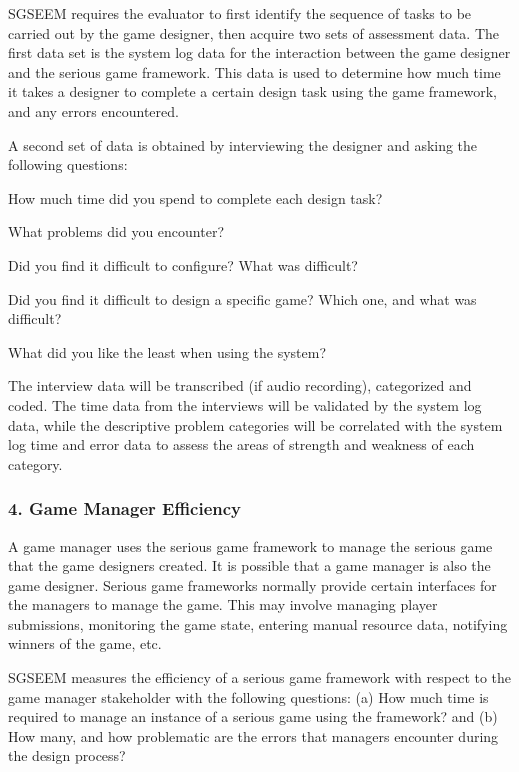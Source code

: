 \documentclass{sigchi}
\begin{document}
SGSEEM requires the evaluator to first identify the sequence of tasks to be carried out by
the game designer, then acquire two sets of assessment data.
The first data set is the system log data for the interaction between the game designer
and the serious game framework. This data is used to determine how much
time it takes a designer to complete a certain design task using the game
framework, and any errors encountered. 

A second set of data is obtained by interviewing the designer and asking the following questions:
\begin{compactitem}
\item How much time did you spend to complete each design task?
\item What problems did you encounter?
\item Did you find it difficult to configure? What was difficult?
\item Did you find it difficult to design a specific game? Which one, and what was difficult?
\item What did you like the least when using the system?
\end{compactitem}

The interview data will be transcribed (if audio recording), categorized and coded. The time
data from the interviews will be validated by the system log data, while the descriptive problem
categories will be correlated with the system log time and error data to assess the areas of
strength and weakness of each category.

\subsubsection{4. Game Manager Efficiency}

A game manager uses the serious game framework to manage the serious game that the game
designers created. It is possible that a game manager is also the game designer.
Serious game frameworks normally provide certain interfaces for the managers to manage the
game. This may involve managing player submissions, monitoring the game state, entering
manual resource data, notifying winners of the game, etc.

SGSEEM measures the efficiency of a serious game framework with respect to the game
manager stakeholder with the following questions: (a) How much time is
required to manage an instance of a serious game using the framework? and (b) How many,
and how problematic are the errors that managers encounter during the design process?
\end{document}
